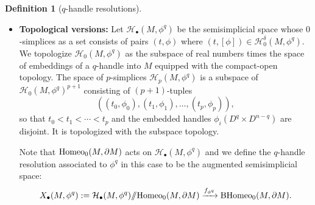 \documentclass[a4paper]{amsart}
\theoremstyle{definition}
\newtheorem{defn}[thm]{Definition}
\theoremstyle{remark}
\newtheorem{rem}[thm]{Remark}
\newcommand{\hcoker}{/\!\!/}
\newcommand{\tH}{\text{\textnormal{Homeo}}}
\newcommand{\BH}{\mathrm{B}\text{\textnormal{Homeo}}}
\newcommand{\tdH}{\text{Homeo}^{\delta}}
\newcommand{\BdH}{\mathrm{B}\text{\textnormal{Homeo}}^{\delta}}
\numberwithin{equation}{section}
\begin{document}
\begin{defn}[$q$-handle resolutions]
\begin{itemize}[leftmargin=*]
\begin{itemize}
\item Let $\overline{\mathcal{H}}^{\delta}_{\bullet}(M,\phi^q)$ be the semisimplicial set whose  $0$-simplices consist of pairs $(t,\phi)$ where $(t,[\phi])\in \mathcal{H}^{\delta}_{0}(M,\phi^q)$. Note that the difference here is we consider actual embeddings not just their germs around the core. And let $p$-simplices be the subset of $\mathcal{H}^{\delta}_{0}(M,\phi^q)^{p+1}$ consisting of those $(p+1)$-tuples
$$((t_0,\phi_0), (t_1,\phi_1),\dots, (t_p, \phi_p)),$$
where the cores of $\phi_i$'s are pairwise disjoint.
\end{itemize}
 \begin{rem}
Note that by definition, for every pair $(t,[\phi])\in \mathcal{H}_{0}^{\delta}(M,\phi^q)$, the real number $t$ is uniquely determined by $\phi$. We denote this $t$-coordinate by $t_{\phi}$.
\end{rem}
 The group $\tdH_0(M,\partial M)$ acts on $\mathcal{H}^{\delta}_{\bullet}(M,\phi^q)$ and $\overline{\mathcal{H}}^{\delta}_{\bullet}(M,\phi^q)$. The $q$-handle resolution associated to $\phi^q$ in this case is
\[
X^{\delta}_{\bullet}(M,\phi^q):= \mathcal{H}^{\delta}_{\bullet}(M,\phi^q)\hcoker \tdH_0(M,\partial M)\xrightarrow{g_{\phi^q}} \BdH_0(M,\partial M).
\]

\item {\bf Topological versions:} Let $\mathcal{H}_{\bullet}(M,\phi^q)$ be the semisimplicial space whose $0$-simplices as a set consists of pairs $(t,\phi)$ where $(t,[\phi])\in\mathcal{H}^{\delta}_{0}(M,\phi^q)$. We topologize $\mathcal{H}_0(M,\phi^q) $ as the subspace of real numbers times the space of embeddings of a $q$-handle into $M$ equipped with the compact-open topology. The space of $p$-simplices $\mathcal{H}_p(M,\phi^q)$ is a subspace of  $\mathcal{H}_0(M,\phi^q)^{p+1}$ consisting of $(p+1)$-tuples $$((t_0,\phi_0), (t_1,\phi_1),\dots, (t_p, \phi_p)),$$ so that $t_0<t_1<\cdots<t_p$ and  the embedded handles  $\phi_i(D^q\times D^{n-q})$ are disjoint. It is topologized with the subspace topology.

Note that $\tH_0(M,\partial M)$ acts on $\mathcal{H}_{\bullet}(M,\phi^q)$ and we define the $q$-handle resolution associated to $\phi^q$ in this case to be the augmented semisimplicial space:
\[
X_{\bullet}(M,\phi^q):= \mathcal{H}_{\bullet}(M,\phi^q)\hcoker \tH_0(M,\partial M)\xrightarrow{f_{\phi^q}} \BH_0(M,\partial M).
\]


\end{itemize}
\end{defn}
\end{document}
